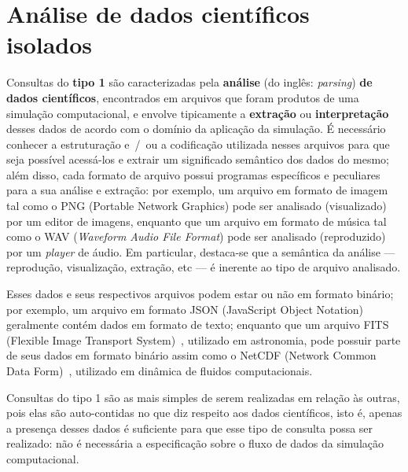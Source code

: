 \section{Análise de dados científicos isolados}%
\label{sec:analise-de-dados-cientificos-isolados}

Consultas do \textbf{tipo 1} são caracterizadas pela \textbf{análise} (do inglês: \textit{parsing}) \textbf{de dados científicos}, encontrados em arquivos que foram produtos de uma simulação computacional, e envolve tipicamente a \textbf{extração} ou \textbf{interpretação} desses dados de acordo com o domínio da aplicação da simulação. É necessário conhecer a estruturação e~/~ou a codificação utilizada nesses arquivos para que seja possível acessá-los e extrair um significado semântico dos dados do mesmo; além disso, cada formato de arquivo possui programas específicos e peculiares para a sua análise e extração: por exemplo, um arquivo em formato de imagem tal como o  PNG (Portable Network Graphics) pode ser analisado (visualizado) por um editor de imagens, enquanto que um arquivo em formato de música tal como o  WAV (\textit{Waveform Audio File Format}) pode ser analisado (reproduzido) por um \textit{player} de áudio. Em particular, destaca-se que a semântica da análise --- reprodução, visualização, extração, etc --- é inerente ao tipo de arquivo analisado.

Esses dados e seus respectivos arquivos podem estar ou não em formato binário; por exemplo, um arquivo em formato  JSON (JavaScript Object Notation) geralmente contém dados em formato de texto; enquanto que um arquivo FITS (Flexible Image Transport System)~\cite{greisen2002representations}, utilizado em astronomia, pode possuir parte de seus dados em formato binário assim como o NetCDF (Network Common Data Form)~\cite{rew1990netcdf}, utilizado em dinâmica de fluidos computacionais.

Consultas do tipo 1 são as mais simples de serem realizadas em relação às outras, pois elas são auto-contidas no que diz respeito aos dados científicos, isto é, apenas a presença desses dados é suficiente para que esse tipo de consulta possa ser realizado: não é necessária a especificação sobre o fluxo de dados da simulação computacional.


